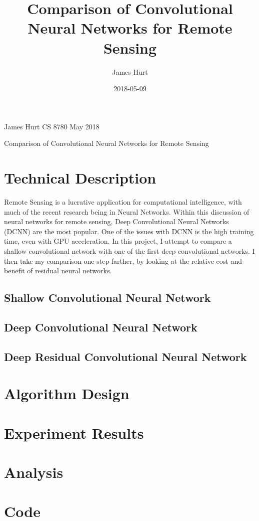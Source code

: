 \documentclass[11pt]{article}
\title{Comparison of Convolutional Neural Networks for Remote Sensing}
\date{2018-05-09}
\author{James Hurt}
\begin{document}
	
	\begin{flushright}
		James Hurt\break
		CS 8780 May 2018
	\end{flushright}
	\begin{center}
		\huge{Comparison of Convolutional Neural Networks for Remote Sensing}\break
	\end{center}
	
	
	\section{Technical Description}
	
		Remote Sensing is a lucrative application for computational intelligence, with much of the recent research being in Neural Networks. Within this discussion of neural networks for 		remote sensing, Deep Convolutional Neural Networks (DCNN) are the most popular. One of the issues with DCNN is the high training time, even with GPU acceleration. In this project, I attempt to compare a shallow convolutional network with one of the first deep convolutional networks. I then take my comparison one step farther, by looking at the relative cost and benefit of residual neural networks. 
		
		\subsection{Shallow Convolutional Neural Network}
		\subsection{Deep Convolutional Neural Network}
		\subsection{Deep Residual Convolutional Neural Network}
	
	\section{Algorithm Design}
	
	\section{Experiment Results}
	
	\section{Analysis}
	
	\section{Code}
	
	
\end{document}
